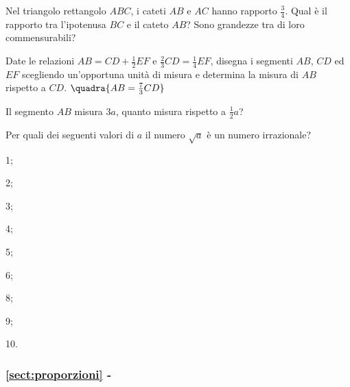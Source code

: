 \begin{esercizio}
\label{ese:6.9}
Nel triangolo rettangolo \(ABC\), i cateti \(AB\) e \(AC\) hanno rapporto 
\(\frac{3}{4}\). Qual è il rapporto tra  l'ipotenusa \(BC\) e il cateto 
\(AB\)? Sono grandezze tra di loro commensurabili?
\end{esercizio}

\begin{esercizio}
\label{ese:6.10}
Date le relazioni \(AB=CD+\frac{1}{2}EF\) e 
\(\frac{2}{3}CD=\frac{1}{4}EF\), disegna i segmenti \(AB\), \(CD\) ed \(EF\) 
scegliendo un'opportuna unità di misura e determina la misura di \(AB\) 
rispetto a \(CD\). 
\hfill\(\quadra{AB=\frac{7}{3}CD}\)
\end{esercizio}

\begin{esercizio}
\label{ese:6.11}
Il segmento \(AB\) misura \(3a\), quanto misura rispetto a 
\(\frac{1}{2}a\)? 
\end{esercizio}

\begin{esercizio}
\label{ese:6.12}
Per quali dei seguenti valori di \(a\) il numero \(\sqrt{a}\) è un numero 
irrazionale?
\begin{multicols}{5}
\begin{enumeratea}
\item 1;
\item 2;
\item 3;
\item 4;
\item 5;
\item 6;
\item 8;
\item 9;
\item 10.
\end{enumeratea}
\end{multicols}
\end{esercizio}

\begingroup
\hypersetup{linkcolor=black}
\subsubsection*{\ref{sect:proporzioni} - }
\endgroup


